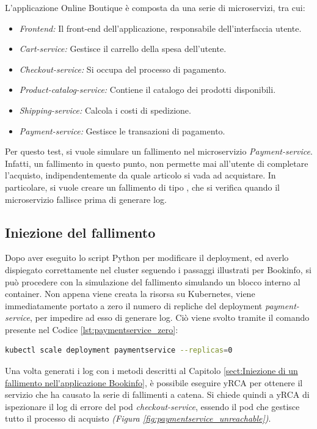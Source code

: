L'applicazione Online Boutique è composta da una serie di microservizi, tra cui:

\begin{itemize}
    \item \textit{Frontend:} Il front-end dell'applicazione, responsabile dell'interfaccia utente.
    \item \textit{Cart-service:} Gestisce il carrello della spesa dell'utente.
    \item \textit{Checkout-service:} Si occupa del processo di pagamento.
    \item \textit{Product-catalog-service:} Contiene il catalogo dei prodotti disponibili.
    \item \textit{Shipping-service:} Calcola i costi di spedizione.
    \item \textit{Payment-service:} Gestisce le transazioni di pagamento.
\end{itemize}

Per questo test, si vuole simulare un fallimento nel microservizio \textit{Payment-service}. Infatti, un fallimento in questo punto, non permette mai all'utente di completare l'acquisto, indipendentemente da quale articolo si vada ad acquistare. In particolare, si vuole creare un fallimento di tipo , che si verifica quando il microservizio fallisce prima di generare log.

\subsection{Iniezione del fallimento}

Dopo aver eseguito lo script Python per modificare il deployment, ed averlo dispiegato correttamente nel cluster seguendo i passaggi illustrati per Bookinfo, si può procedere con la simulazione del fallimento simulando un blocco interno al container. Non appena viene creata la risorsa su Kubernetes, viene immediatamente portato a zero il numero di repliche del deployment \textit{payment-service}, per impedire ad esso di generare log. Ciò viene svolto tramite il comando presente nel Codice \ref{lst:paymentservice_zero}:
\begin{lstlisting}[caption={Configurazione del numero di repliche di \textit{payment-service.}}, label=lst:paymentservice_zero, language=bash]
    kubectl scale deployment paymentservice --replicas=0
\end{lstlisting}

Una volta generati i log con i metodi descritti al Capitolo \ref{sect:Iniezione di un fallimento nell'applicazione Bookinfo}, è possibile eseguire yRCA per ottenere il servizio che ha causato la serie di fallimenti a catena. Si chiede quindi a yRCA di ispezionare il log di errore del pod \textit{checkout-service}, essendo il pod che gestisce tutto il processo di acquisto \textit{(Figura \ref{fig:paymentservice_unreachable})}.

